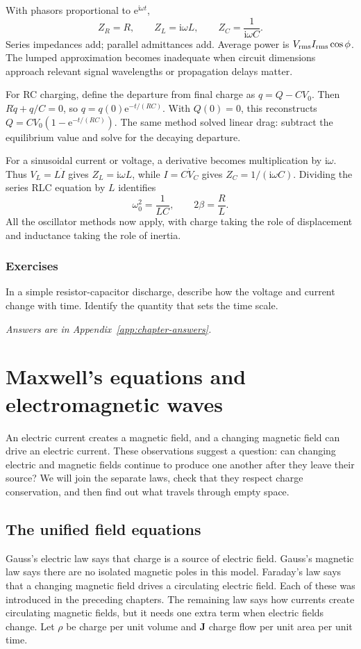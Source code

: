 \documentclass[11pt,oneside]{book}
\newcommand{\ii}{\mathrm{i}}
\newcommand{\ee}{\mathrm{e}}
\newcommand{\vect}[1]{\boldsymbol{#1}}
\theoremstyle{reviewstyle}
\newcommand{\learningcheck}[1]{\subsection*{Exercises}\noindent #1\par\smallskip\noindent\emph{Answers are in Appendix~\ref{app:chapter-answers}.}}
\begin{document}
With phasors proportional to $\ee^{\ii\omega t}$,
\begin{equation}Z_R=R,\qquad Z_L=\ii\omega L,\qquad Z_C=\frac1{\ii\omega C}.\end{equation}
Series impedances add; parallel admittances add. Average power is $V_{\rm rms}I_{\rm rms}\cos\phi$. The lumped approximation becomes inadequate when circuit dimensions approach relevant signal wavelengths or propagation delays matter.

For RC charging, define the departure from final charge as $q=Q-CV_0$. Then $R\dot q+q/C=0$, so $q=q(0)\ee^{-t/(RC)}$. With $Q(0)=0$, this reconstructs $Q=CV_0(1-\ee^{-t/(RC)})$. The same method solved linear drag: subtract the equilibrium value and solve for the decaying departure.

For a sinusoidal current or voltage, a derivative becomes multiplication by $\ii\omega$. Thus $V_L=L\dot I$ gives $Z_L=\ii\omega L$, while $I=C\dot V_C$ gives $Z_C=1/(\ii\omega C)$. Dividing the series RLC equation by $L$ identifies
\begin{equation}
\omega_0^2=\frac1{LC},\qquad 2\beta=\frac RL.
\end{equation}
All the oscillator methods now apply, with charge taking the role of displacement and inductance taking the role of inertia.

\learningcheck{In a simple resistor-capacitor discharge, describe how the voltage and current change with time. Identify the quantity that sets the time scale.}

\chapter{Maxwell's equations and electromagnetic waves}
An electric current creates a magnetic field, and a changing magnetic field can drive an electric current. These observations suggest a question: can changing electric and magnetic fields continue to produce one another after they leave their source? We will join the separate laws, check that they respect charge conservation, and then find out what travels through empty space.

\section{The unified field equations}
Gauss's electric law says that charge is a source of electric field. Gauss's magnetic law says there are no isolated magnetic poles in this model. Faraday's law says that a changing magnetic field drives a circulating electric field. Each of these was introduced in the preceding chapters. The remaining law says how currents create circulating magnetic fields, but it needs one extra term when electric fields change. Let $\rho$ be charge per unit volume and $\vect J$ charge flow per unit area per unit time.
\end{document}
